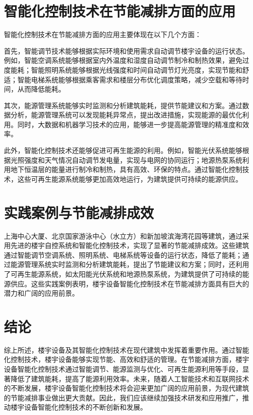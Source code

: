 \documentclass[12pt, a4paper, oneside]{ctexart} %
\begin{document}
\section{智能化控制技术在节能减排方面的应用}
智能化控制技术在节能减排方面的应用主要体现在以下几个方面：
\par 首先，智能调节技术能够根据实际环境和使用需求自动调节楼宇设备的运行状态。例如，智能空调系统能够根据室内外温度和湿度自动调节制冷和制热效果，避免过度能耗；智能照明系统能够根据光线强度和时间自动调节灯光亮度，实现节能和舒适；智能电梯系统能够根据乘客需求和楼层分布优化调度策略，减少空载和等待时间，从而降低能耗。
\par 其次，能源管理系统能够实时监测和分析建筑能耗，提供节能建议和方案。通过数据分析，能源管理系统可以发现能耗异常点，提出改进措施，实现能源的最优化利用。同时，大数据和机器学习技术的应用，能够进一步提高能源管理的精准度和效率。
\par 此外，智能化控制技术还能够促进可再生能源的利用。例如，智能光伏系统能够根据光照强度和天气情况自动调节发电量，实现与电网的协同运行；地源热泵系统利用地下恒温层的能量进行制冷和制热，具有高效、环保的特点。通过智能化控制技术，这些可再生能源系统能够更加高效地运行，为建筑提供可持续的能源供应。


\section{实践案例与节能减排成效}
上海中心大厦、北京国家游泳中心（水立方）和新加坡滨海湾花园等建筑，通过采用先进的楼宇自控系统和智能化控制技术，实现了显著的节能减排成效。这些建筑通过智能调节空调系统、照明系统、电梯系统等设备的运行状态，降低了能耗；通过能源管理系统实时监测和分析建筑能耗，提出了节能建议和方案；同时，还利用了可再生能源系统，如太阳能光伏系统和地源热泵系统，为建筑提供了可持续的能源供应。这些实践案例表明，楼宇设备智能化控制技术在节能减排方面具有巨大的潜力和广阔的应用前景。
\section{结论}
综上所述，楼宇设备及其智能化控制技术在现代建筑中发挥着重要作用。通过智能化控制技术，楼宇设备能够实现节能、高效和舒适的管理。在节能减排方面，楼宇设备智能化控制技术通过智能调节、能源监测与优化、可再生能源利用等手段，显著降低了建筑能耗，提高了能源利用效率。未来，随着人工智能技术和互联网技术的不断发展，楼宇设备智能化控制技术将会迎来更加广阔的应用前景，为现代建筑的节能减排事业做出更大贡献。因此，我们应该继续加强技术研发和应用推广，推动楼宇设备智能化控制技术的不断创新和发展。

\end{document}
